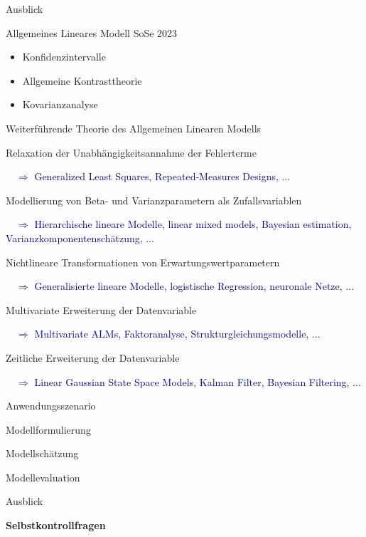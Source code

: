 \documentclass[
  8pt,
  ignorenonframetext,
]{beamer}
\providecommand{\tightlist}{%
  \setlength{\itemsep}{0pt}\setlength{\parskip}{0pt}}
\begin{document}
\begin{frame}{Ausblick}
\protect\hypertarget{ausblick}{}

\small

Allgemeines Lineares Modell SoSe 2023

\footnotesize

\begin{itemize}
\tightlist
\item
  Konfidenzintervalle
\item
  Allgemeine Kontrasttheorie
\item
  Kovarianzanalyse
\end{itemize}

\small

Weiterführende Theorie des Allgemeinen Linearen Modells

\footnotesize

Relaxation der Unabhängigkeitsannahme der Fehlerterme

\textcolor{darkblue}{$\quad\Rightarrow$ Generalized Least Squares, Repeated-Measures Designs, ...}

Modellierung von Beta- und Varianzparametern als Zufallsvariablen

\textcolor{darkblue}{$\quad\Rightarrow$ Hierarchische lineare Modelle, linear mixed models, Bayesian estimation, Varianzkomponentenschätzung, ...}

Nichtlineare Transformationen von Erwartungswertparametern

\textcolor{darkblue}{$\quad\Rightarrow$ Generalisierte lineare Modelle, logistische Regression, neuronale Netze, ...}

Multivariate Erweiterung der Datenvariable

\textcolor{darkblue}{$\quad\Rightarrow$ Multivariate ALMs, Faktoranalyse, Strukturgleichungsmodelle, ...}

Zeitliche Erweiterung der Datenvariable

\textcolor{darkblue}{$\quad\Rightarrow$ Linear Gaussian State Space Models, Kalman Filter, Bayesian Filtering, ...}
\end{frame}

\begin{frame}{}
\protect\hypertarget{section-9}{}
\large
{}
\vfill

Anwendungsszenario

Modellformulierung

Modellschätzung

Modellevaluation

Ausblick

\textbf{Selbstkontrollfragen} \vfill
\end{frame}
\end{document}
